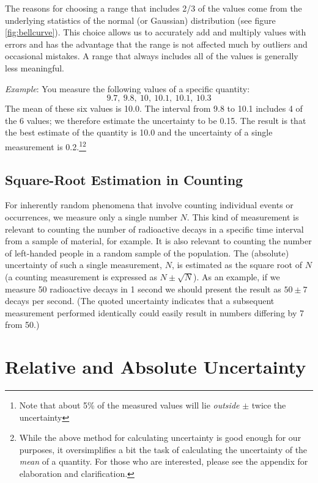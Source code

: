 \documentclass[letterpaper, 12pt]{book}
\newcommand{\myskip}{\vspace{0.5\baselineskip}}
\begin{document}
The reasons for choosing a range that includes 2/3 of the values come from the underlying statistics of the normal (or Gaussian) distribution (see figure \ref{fig:bellcurve}). This choice allows us to accurately add and multiply values with errors and has the advantage that the range is not affected much by outliers and occasional mistakes. A range that always includes all of the values is generally less meaningful. \myskip

\emph{Example}: You measure the following values of a specific quantity:
\begin{equation*}
    9.7,\:9.8,\:10,\:10.1,\:10.1,\:10.3
\end{equation*}
The mean of these six values is 10.0. The interval from 9.8 to 10.1 includes 4 of the 6 values; we therefore estimate the uncertainty to be 0.15. The result is that the best estimate of the quantity is 10.0 and the uncertainty of a single measurement is 0.2.\footnote{Note that about 5\% of the measured values will lie \emph{outside} $\pm$ twice the uncertainty}\footnote{While the above method for calculating uncertainty is good enough for our purposes, it oversimplifies a bit the task of calculating the uncertainty of the \emph{mean} of a quantity.  For those who are interested, please see the appendix for elaboration and clarification. }

\subsection{Square-Root Estimation in Counting}

For inherently random phenomena that involve counting individual events or occurrences, we measure only a single number $N$. This kind of measurement is relevant to counting the number of radioactive decays in a specific time interval from a sample of material, for example. It is also relevant to counting the number of left-handed people in a random sample of the population. The (absolute) uncertainty of such a single measurement, $N$, is estimated as the square root of $N$ (a counting measurement is expressed as $N \pm \sqrt{N}$). As an example, if we measure 50 radioactive decays in 1 second we should present the result as $50\pm 7$ decays per second. (The quoted uncertainty indicates that a subsequent measurement performed identically could easily result in numbers differing by 7 from 50.)

\section{Relative and Absolute Uncertainty}
\end{document}
